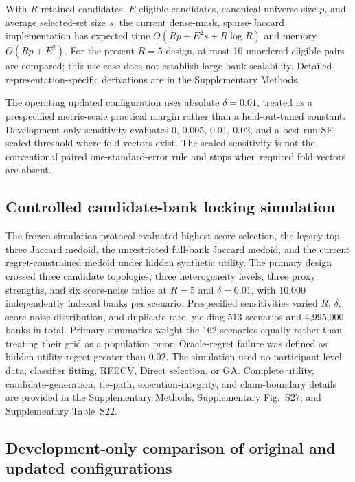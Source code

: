 With \(R\) retained candidates, \(E\) eligible candidates, canonical-universe size \(p\), and average selected-set size \(s\), the current dense-mask, sparse-Jaccard implementation has expected time \(O(Rp+E^2s+R\log R)\) and memory \(O(Rp+E^2)\). For the present \(R=5\) design, at most 10 unordered eligible pairs are compared; this use case does not establish large-bank scalability. Detailed representation-specific derivations are in the Supplementary Methods.

The operating updated configuration uses absolute \(\delta=0.01\), treated as a prespecified metric-scale practical margin rather than a held-out-tuned constant. Development-only sensitivity evaluates 0, 0.005, 0.01, 0.02, and a best-run-SE-scaled threshold where fold vectors exist. The scaled sensitivity is not the conventional paired one-standard-error rule and stops when required fold vectors are absent.

\subsection{Controlled candidate-bank locking simulation}

The frozen simulation protocol evaluated highest-score selection, the legacy top-three Jaccard medoid, the unrestricted full-bank Jaccard medoid, and the current regret-constrained medoid under hidden synthetic utility. The primary design crossed three candidate topologies, three heterogeneity levels, three proxy strengths, and six score-noise ratios at $R=5$ and $\delta=0.01$, with 10,000 independently indexed banks per scenario. Prespecified sensitivities varied $R$, $\delta$, score-noise distribution, and duplicate rate, yielding 513 scenarios and 4,995,000 banks in total. Primary summaries weight the 162 scenarios equally rather than treating their grid as a population prior. Oracle-regret failure was defined as hidden-utility regret greater than 0.02. The simulation used no participant-level data, classifier fitting, RFECV, Direct selection, or GA. Complete utility, candidate-generation, tie-path, execution-integrity, and claim-boundary details are provided in the Supplementary Methods, Supplementary Fig.~S27, and Supplementary Table~S22.

\subsection{Development-only comparison of original and updated configurations}

